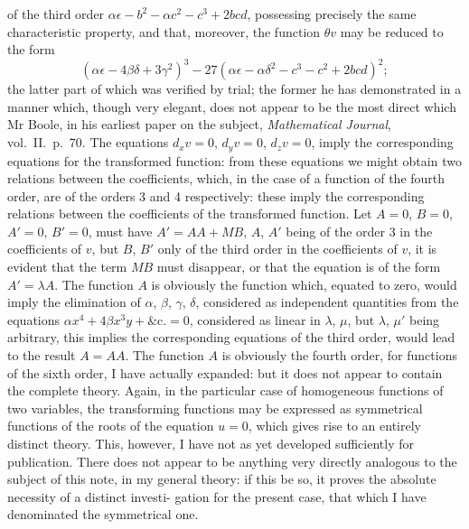 \documentclass[11pt,a4paper]{article}
\theoremstyle{plain}
\theoremstyle{definition}
\theoremstyle{remark}
\begin{document}
\newpage

of the third order $\alpha\epsilon - b^2 - \alpha c^2 - c^3 + 2bcd$, possessing precisely the same characteristic
property, and that, moreover, the function $\theta v$ may be reduced to the form
\[
(\alpha\epsilon - 4\beta\delta + 3\gamma^2)^3 - 27(\alpha\epsilon - \alpha\delta^2 - c^3 - c^2 + 2bcd)^2;
\]
the latter part of which was verified by trial; the former he has demonstrated in a
manner which, though very elegant, does not appear to be the most direct which Mr
Boole, in his earliest paper on the subject, \textit{Mathematical Journal}, vol.\ II.\ p.\ 70.
The equations $d_xv=0$, $d_yv=0$, $d_zv=0$, imply the corresponding equations for the
transformed function: from these equations we might obtain two relations between the
coefficients, which, in the case of a function of the fourth order, are of the orders 3
and 4 respectively: these imply the corresponding relations between the coefficients of
the transformed function. Let $A=0$, $B=0$, $A'=0$, $B'=0$, must have $A'=AA+MB$, $A$, $A'$ being
of the order 3 in the coefficients of $v$, but $B$, $B'$ only of
the third order in the coefficients of $v$, it is evident that the term $MB$ must disappear,
or that the equation is of the form $A'=\lambda A$. The function $A$ is obviously the function
which, equated to zero, would imply the elimination of $\alpha$, $\beta$, $\gamma$, $\delta$, considered
as independent quantities from the equations $\alpha x^4 + 4\beta x^3y + \&\text{c.} = 0$, considered as
linear in $\lambda$, $\mu$, but $\lambda$, $\mu'$ being arbitrary, this implies the corresponding equations of
the third order, would lead to the result $A=AA$. The function $A$ is obviously the
fourth order, for functions of the sixth order, I have actually expanded: but it does not
appear to contain the complete theory. Again, in the particular case of homogeneous
functions of two variables, the transforming functions may be expressed as symmetrical
functions of the roots of the equation $u=0$, which gives rise to an entirely distinct
theory. This, however, I have not as yet developed sufficiently for publication. There
does not appear to be anything very directly analogous to the subject of this note, in
my general theory: if this be so, it proves the absolute necessity of a distinct investi-
gation for the present case, that which I have denominated the symmetrical one.

\newpage
\end{document}
